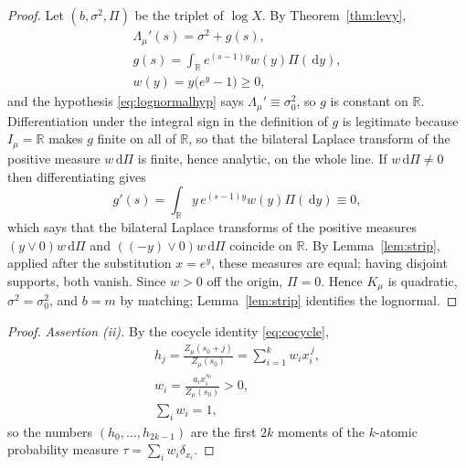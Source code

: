 \documentclass[sn-mathphys-num]{sn-jnl}
\theoremstyle{thmstyleone}%
\theoremstyle{thmstyletwo}%
\theoremstyle{thmstylethree}%
\theoremstyle{thmstyleone}%
\providecommand{\R}{\mathbb{R}}
\providecommand{\dd}{\,\mathrm{d}}
\begin{document}
\begin{appendices}
		\begin{proof}
			Let $(b,\sigma^2,\Pi)$ be the triplet of $\log X$. By
			Theorem~\ref{thm:levy},
			\begin{equation}\label{eq:lncharderiv}
				\begin{gathered}
					\Lambda_\mu'(s)=\sigma^2+g(s),\\
					g(s)=\int_\R e^{(s-1)y}w(y)\Pi(\dd y),\\
					w(y)=y\bigl(e^y-1\bigr)\ge0,
				\end{gathered}
			\end{equation}
			and the hypothesis \eqref{eq:lognormalhyp} says
			$\Lambda_\mu'\equiv\sigma_0^2$, so $g$ is constant on $\R$.
			Differentiation under the integral sign in the definition of
			$g$ is legitimate because $I_\mu=\R$ makes $g$ finite on all of
			$\R$, so that the bilateral Laplace transform of the positive
			measure $w\dd\Pi$ is finite, hence analytic, on the whole line.
			If $w\dd\Pi\neq0$ then differentiating gives
			\begin{equation}\label{eq:lncharzero}
				g'(s)=\int_\R y\,e^{(s-1)y}w(y)\Pi(\dd y)\equiv0,
			\end{equation}
			which says that the bilateral Laplace transforms of the
			positive measures $(y\vee0)w\dd\Pi$ and
			$((-y)\vee0)w\dd\Pi$ coincide on $\R$. By
			Lemma~\ref{lem:strip}, applied after the substitution
			$x=e^{y}$, these measures are equal; having disjoint supports,
			both vanish. Since $w>0$ off the origin, $\Pi=0$. Hence
			$K_\mu$ is quadratic, $\sigma^2=\sigma_0^2$, and $b=m$ by
			matching; Lemma~\ref{lem:strip} identifies the lognormal.
		\end{proof}
		
		\thmprony*
		
		\begin{proof}
			\emph{Assertion (ii).} By the cocycle identity
			\eqref{eq:cocycle},
			\begin{equation}\label{eq:pronyh}
				\begin{gathered}
					h_j=\frac{Z_\mu(s_0+j)}{Z_\mu(s_0)}
					=\sum_{i=1}^kw_ix_i^{\,j},\\
					w_i=\frac{a_ix_i^{s_0}}{Z_\mu(s_0)}>0,\\
					\sum_iw_i=1,
				\end{gathered}
			\end{equation}
			so the numbers $(h_0,\dots,h_{2k-1})$ are the first $2k$
			moments of the $k$-atomic probability measure
			$\tau=\sum_iw_i\delta_{x_i}$.
			

\end{proof}
\end{appendices}
\end{document}
